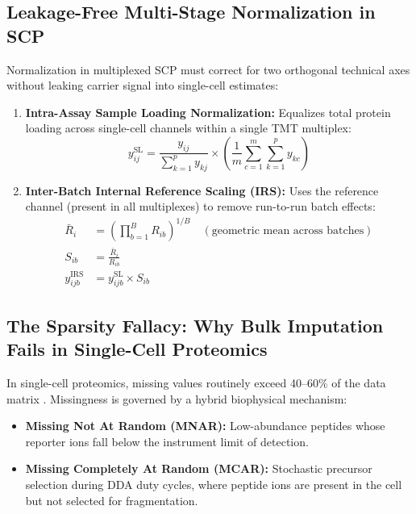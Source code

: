 \documentclass[11pt,twoside,openright]{book}
\begin{document}
\subsection{Leakage-Free Multi-Stage Normalization in SCP}

Normalization in multiplexed SCP must correct for two orthogonal technical axes without leaking carrier signal into single-cell estimates:
\begin{enumerate}
    \item \textbf{Intra-Assay Sample Loading Normalization:} Equalizes total protein loading across single-cell channels within a single TMT multiplex:
    \begin{equation}
    y_{ij}^{\text{SL}} = \frac{y_{ij}}{\sum_{k=1}^p y_{kj}} \times \left( \frac{1}{m} \sum_{c=1}^m \sum_{k=1}^p y_{kc} \right)
    \end{equation}
    \item \textbf{Inter-Batch Internal Reference Scaling (IRS):} Uses the reference channel (present in all multiplexes) to remove run-to-run batch effects:
    \begin{align}
    \bar{R}_i &= \left( \prod_{b=1}^B R_{ib} \right)^{1/B} \quad (\text{geometric mean across batches}) \\
    S_{ib} &= \frac{\bar{R}_i}{R_{ib}} \\
    y_{ijb}^{\text{IRS}} &= y_{ijb}^{\text{SL}} \times S_{ib}
    \end{align}
\end{enumerate}

\subsection{The Sparsity Fallacy: Why Bulk Imputation Fails in Single-Cell Proteomics}

In single-cell proteomics, missing values routinely exceed 40--60\% of the data matrix \cite{vanderaa2021scp, brunner2022ultra}. Missingness is governed by a hybrid biophysical mechanism:
\begin{itemize}
    \item \textbf{Missing Not At Random (MNAR):} Low-abundance peptides whose reporter ions fall below the instrument limit of detection.
    \item \textbf{Missing Completely At Random (MCAR):} Stochastic precursor selection during DDA duty cycles, where peptide ions are present in the cell but not selected for fragmentation.
\end{itemize}
\end{document}
